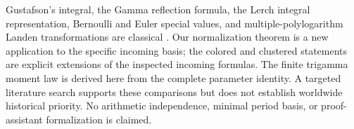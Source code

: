 Gustafson's integral, the Gamma reflection formula, the Lerch integral
representation, Bernoulli and Euler special values, and
multiple-polylogarithm Landen transformations are classical
\cite{gustafson1994,derkachov2017,dlmfgamma,dlmflerch,dlmfhurwitz,okudaueno}.
Our normalization theorem is a new application to the specific
incoming basis; the colored and clustered statements are explicit
extensions of the inspected incoming formulas. The finite trigamma
moment law is derived here from the complete parameter identity.
A targeted literature search supports these comparisons but does not
establish worldwide historical priority. No arithmetic independence,
minimal period basis, or proof-assistant formalization is claimed.


